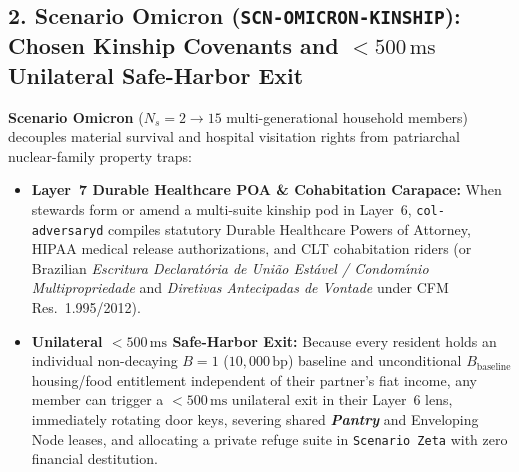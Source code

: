 \subsection{2. Scenario Omicron (\texttt{SCN-OMICRON-KINSHIP}): Chosen Kinship Covenants and $<500\,\mathrm{ms}$ Unilateral Safe-Harbor Exit}
\textbf{Scenario Omicron} ($N_s = 2 \to 15$ multi-generational household members) decouples material survival and hospital visitation rights from patriarchal nuclear-family property traps:
\begin{itemize}
    \item \textbf{Layer~7 Durable Healthcare POA \& Cohabitation Carapace:} When stewards form or amend a multi-suite kinship pod in Layer~6, \texttt{col-adversaryd} compiles statutory Durable Healthcare Powers of Attorney, HIPAA medical release authorizations, and CLT cohabitation riders (or Brazilian \textit{Escritura Declarat{\'o}ria de Uni{\~a}o Est{\'a}vel / Condom{\'\i}nio Multipropriedade} and \textit{Diretivas Antecipadas de Vontade} under CFM Res.~1.995/2012).
    \item \textbf{Unilateral $<500\,\mathrm{ms}$ Safe-Harbor Exit:} Because every resident holds an individual non-decaying $B = 1$ ($10{,}000\,\mathrm{bp}$) baseline and unconditional $B_{\mathrm{baseline}}$ housing/food entitlement independent of their partner's fiat income, any member can trigger a $<500\,\mathrm{ms}$ unilateral exit in their Layer~6 lens, immediately rotating door keys, severing shared \textbf{\textit{Pantry}} and Enveloping Node leases, and allocating a private refuge suite in \texttt{Scenario Zeta} with zero financial destitution.
\end{itemize}

